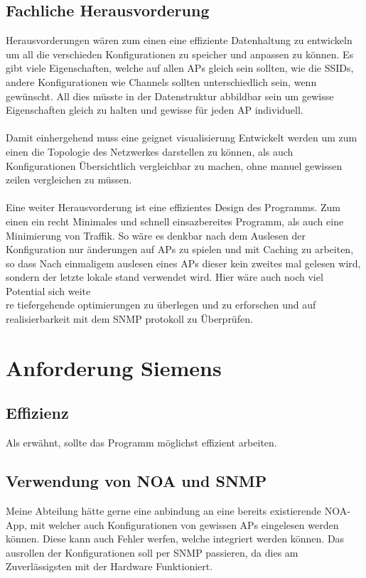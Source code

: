 \subsection{Fachliche Herausvorderung}
Herausvorderungen wären zum einen eine effiziente Datenhaltung zu entwickeln um all die verschieden Konfigurationen zu speicher und anpassen zu können. 
Es gibt viele Eigenschaften, welche auf allen APs gleich sein sollten, wie \zb die SSIDs, andere Konfigurationen wie \zB Channels sollten unterschiedlich sein, wenn gewünscht. 
All dies müsste in der Datenstruktur abbildbar sein um gewisse Eigenschaften gleich zu halten und gewisse für jeden AP individuell.\\
\\
Damit einhergehend muss eine geignet visualisierung Entwickelt werden um zum einen die Topologie des Netzwerkes darstellen zu können, als auch Konfigurationen Übersichtlich vergleichbar zu machen, ohne manuel gewissen zeilen vergleichen zu müssen.\\
\\
Eine weiter Herausvorderung ist eine effizientes Design des Programms.
Zum einen ein recht Minimales und schnell einsazbereites Programm, als auch eine Minimierung von Traffik.
So wäre es \zB denkbar nach dem Auslesen der Konfiguration nur änderungen auf APs zu spielen und mit Caching zu arbeiten, so dass Nach einmaligem auslesen eines APs dieser kein zweites mal gelesen wird, sondern der letzte lokale stand verwendet wird. Hier wäre auch noch viel Potential sich weite\\

re tiefergehende optimierungen zu überlegen und zu erforschen und auf realisierbarkeit mit dem SNMP protokoll zu Überprüfen.
\section{Anforderung Siemens}
\subsection{Effizienz}
Als erwähnt, sollte das Programm möglichst effizient arbeiten.
\subsection{Verwendung von NOA und SNMP}
Meine Abteilung hätte gerne eine anbindung an eine bereits existierende NOA-App, mit welcher auch Konfigurationen von gewissen APs eingelesen werden können. Diese kann auch Fehler werfen, welche integriert werden können. 
Das ausrollen der Konfigurationen soll per SNMP passieren, da dies am Zuverlässigsten mit der Hardware Funktioniert.
